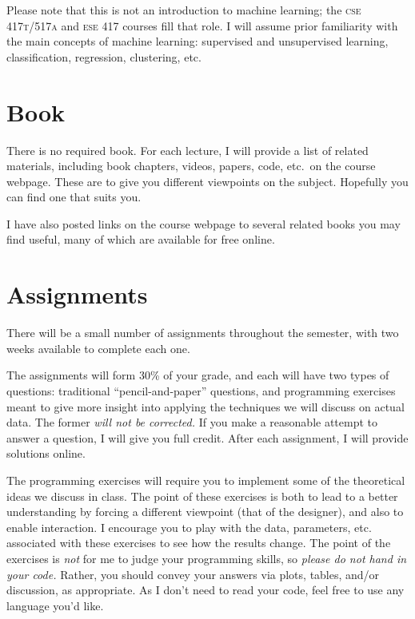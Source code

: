 \documentclass{article}
\newcommand{\acro}[1]{\textsc{\MakeLowercase{#1}}}
\begin{document}
Please note that this is not an introduction to machine learning; the \acro{CSE
  417T/517A} and \acro{ESE 417} courses fill that role.  I will assume prior
familiarity with the main concepts of machine learning: supervised and
unsupervised learning, classification, regression, clustering, etc.

\section*{Book}

There is no required book. For each lecture, I will provide a list of related
materials, including book chapters, videos, papers, code, etc.\ on the course
webpage.  These are to give you different viewpoints on the subject.  Hopefully
you can find one that suits you.

I have also posted links on the course webpage to several related books you may
find useful, many of which are available for free online.

\section*{Assignments}

There will be a small number of assignments throughout the semester, with two
weeks available to complete each one.

The assignments will form 30\% of your grade, and each will have two types of
questions: traditional ``pencil-and-paper'' questions, and programming exercises
meant to give more insight into applying the techniques we will discuss on
actual data.  The former \emph{will not be corrected.}  If you make a reasonable
attempt to answer a question, I will give you full credit.  After each
assignment, I will provide solutions online.

The programming exercises will require you to implement some of the theoretical
ideas we discuss in class.  The point of these exercises is both to lead to a
better understanding by forcing a different viewpoint (that of the designer),
and also to enable interaction.  I encourage you to play with the data,
parameters, etc. associated with these exercises to see how the results change.
The point of the exercises is \emph{not} for me to judge your programming
skills, so \emph{please do not hand in your code.}  Rather, you should convey
your answers via plots, tables, and/or discussion, as appropriate.  As I don't
need to read your code, feel free to use any language you'd like.
\end{document}

